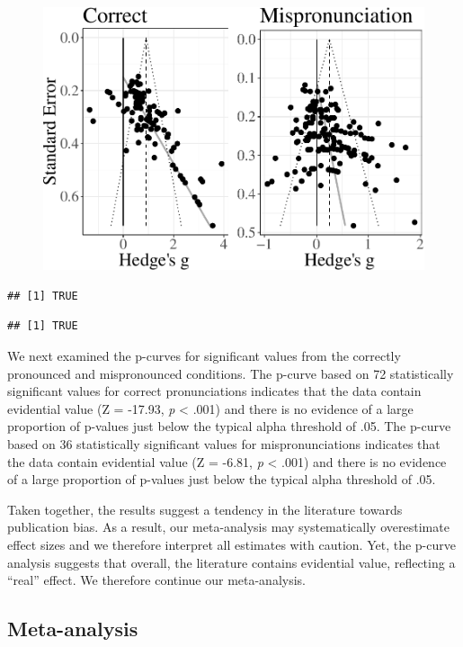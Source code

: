 \documentclass[man]{apa6}
\theoremstyle{definition}
\theoremstyle{definition}
\theoremstyle{definition}
\theoremstyle{remark}
\begin{document}
\begin{figure}[htbp]
\centering
\includegraphics{Paper_Analyses_files/figure-latex/FunnelCombo-1.pdf}
\caption{}
\end{figure}

\begin{verbatim}
## [1] TRUE
\end{verbatim}

\begin{verbatim}
## [1] TRUE
\end{verbatim}

We next examined the p-curves for significant values from the correctly
pronounced and mispronounced conditions. The p-curve based on 72
statistically significant values for correct pronunciations indicates
that the data contain evidential value (Z = -17.93, \emph{p} \textless{}
.001) and there is no evidence of a large proportion of p-values just
below the typical alpha threshold of .05. The p-curve based on 36
statistically significant values for mispronunciations indicates that
the data contain evidential value (Z = -6.81, \emph{p} \textless{} .001)
and there is no evidence of a large proportion of p-values just below
the typical alpha threshold of .05.

Taken together, the results suggest a tendency in the literature towards
publication bias. As a result, our meta-analysis may systematically
overestimate effect sizes and we therefore interpret all estimates with
caution. Yet, the p-curve analysis suggests that overall, the literature
contains evidential value, reflecting a \enquote{real} effect. We
therefore continue our meta-analysis.

\subsection{Meta-analysis}\label{meta-analysis-1}
\end{document}
